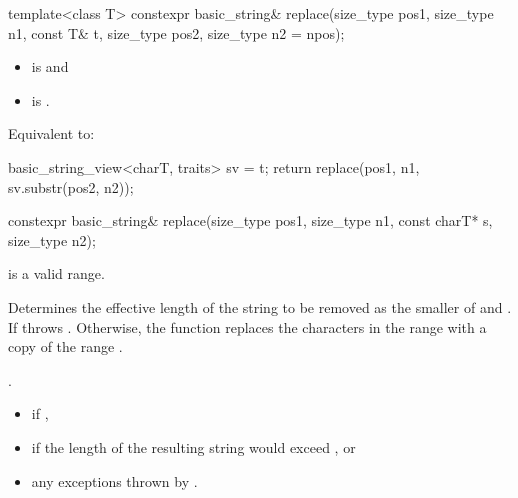 %
\begin{itemdecl}
template<class T>
  constexpr basic_string& replace(size_type pos1, size_type n1, const T& t,
                                  size_type pos2, size_type n2 = npos);
\end{itemdecl}

\begin{itemdescr}
\pnum
\constraints
\begin{itemize}
\item
{} is
 and
\item
{} is
.
\end{itemize}

\pnum
\effects
Equivalent to:
\begin{codeblock}
basic_string_view<charT, traits> sv = t;
return replace(pos1, n1, sv.substr(pos2, n2));
\end{codeblock}
\end{itemdescr}

%
\begin{itemdecl}
constexpr basic_string& replace(size_type pos1, size_type n1, const charT* s, size_type n2);
\end{itemdecl}

\begin{itemdescr}
\pnum
\expects
{} is a valid range.

\pnum
\effects
Determines the effective length  of the string to be
removed as the smaller of  and . If
 throws . Otherwise,
the function replaces the characters in the range
with a copy of the range .

\pnum
\returns
{}.

\pnum
\throws
\begin{itemize}
\item {} if ,
\item {} if the length of the resulting string
would exceed , or
\item any exceptions thrown by .
\end{itemize}
\end{itemdescr}

